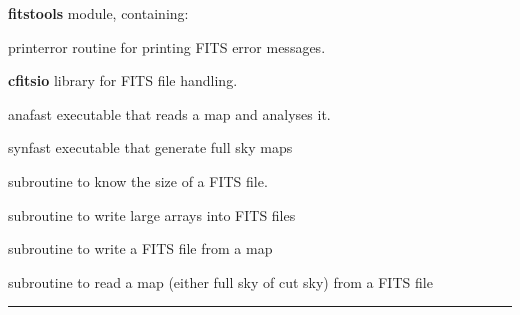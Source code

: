 \begin{modules}
  \begin{sulist}{} %
  \item[\textbf{fitstools}] module, containing:
  \item[printerror] routine for printing FITS error messages.
  \item[\textbf{cfitsio}] library for FITS file handling.		
  \end{sulist}
\end{modules}

\begin{related}
  \begin{sulist}{} %
  \item[anafast] executable that reads a \healpix map and analyses it. 
  \item[synfast] executable that generate full sky \healpix maps
  \item[\htmlref{getsize\_fits}{sub:getsize_fits}] subroutine to know the size of a FITS file.
  \item[\htmlref{write\_bintabh}{sub:write_bintabh}] subroutine to write large arrays into FITS files
  \item[\htmlref{output\_map}{sub:output_map}] subroutine to write a FITS file from a \healpix map
  \item[\htmlref{input\_map}{sub:input_map}] subroutine to read a \healpix map
  (either full sky of cut sky) from a FITS file
  \end{sulist}
\end{related}

\rule{\hsize}{2mm}

\newpage
